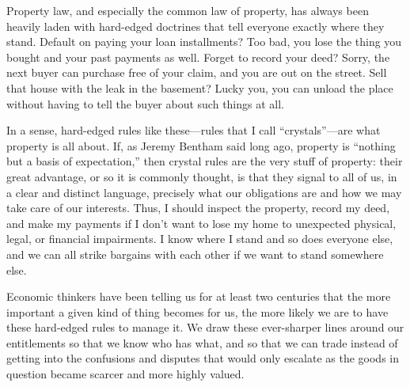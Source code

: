 

Property law, and especially the common law of property, has always been heavily
laden with hard-edged doctrines that tell everyone exactly where they stand.
Default on paying your loan installments? Too bad, you lose the thing you
bought and your past payments as well. Forget to record your deed? Sorry, the
next buyer can purchase free of your claim, and you are out on the street. Sell
that house with the leak in the basement? Lucky you, you can unload the place
without having to tell the buyer about such things at all. 

In a sense, hard-edged rules like these---rules that I call ``crystals''---are
what property is all about. If, as Jeremy Bentham said long ago, property is
``nothing but a basis of expectation,'' then crystal rules are the very stuff of
property: their great advantage, or so it is commonly thought, is that they
signal to all of us, in a clear and distinct language, precisely what our
obligations are and how we may take care of our interests. Thus, I should
inspect the property, record my deed, and make my payments if I don't want to
lose my home to unexpected physical, legal, or financial impairments. I know
where I stand and so does everyone else, and we can all strike bargains with
each other if we want to stand somewhere else. 

Economic thinkers have been telling us for at least two centuries that the more
important a given kind of thing becomes for us, the more likely we are to have
these hard-edged rules to manage it. We draw these ever-sharper lines around
our entitlements so that we know who has what, and so that we can trade instead
of getting into the confusions and disputes that would only escalate as the
goods in question became scarcer and more highly valued.  


